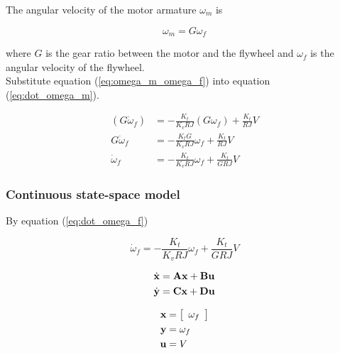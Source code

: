 The angular velocity of the motor armature $\omega_m$ is

\begin{equation}
  \omega_m = G \omega_f \label{eq:omega_m_omega_f}
\end{equation}

where $G$ is the gear ratio between the motor and the flywheel and $\omega_f$ is
the angular velocity of the flywheel. \\

Substitute equation (\ref{eq:omega_m_omega_f}) into equation
(\ref{eq:dot_omega_m}).

\begin{align}
  (G\dot{\omega}_f) &= -\frac{K_t}{K_v RJ} (G\omega_f) + \frac{K_t}{RJ} V
    \nonumber \\
  G\dot{\omega}_f &= -\frac{K_t G}{K_v RJ} \omega_f + \frac{K_t}{RJ} V
    \nonumber \\
  \dot{\omega}_f &= -\frac{K_t}{K_v RJ} \omega_f + \frac{K_t}{GRJ} V
    \label{eq:dot_omega_f}
\end{align}

\subsubsection{Continuous state-space model}

By equation (\ref{eq:dot_omega_f})

\begin{equation*}
  \dot{\omega}_f = -\frac{K_t}{K_v RJ} \omega_f + \frac{K_t}{GRJ} V
\end{equation*}

\begin{align*}
  \dot{\mathbf{x}} &= \mathbf{A} \mathbf{x} + \mathbf{B} \mathbf{u} \\
  \dot{\mathbf{y}} &= \mathbf{C} \mathbf{x} + \mathbf{D} \mathbf{u}
\end{align*}

\begin{align*}
  \mathbf{x} &= \left[
  \begin{array}{c}
    \omega_f
  \end{array}
  \right] \\
  \mathbf{y} &= \omega_f \\
  \mathbf{u} &= V
\end{align*}

